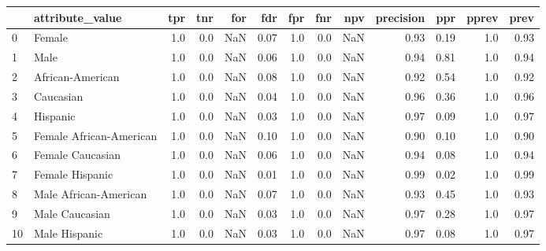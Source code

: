 \begin{tabular}{llrrrrrrrrrrr}
\toprule
{} &          attribute\_value &  tpr &  tnr &  for &   fdr &  fpr &  fnr &  npv &  precision &   ppr &  pprev &  prev \\
\midrule
0  &                   Female &  1.0 &  0.0 &  NaN &  0.07 &  1.0 &  0.0 &  NaN &       0.93 &  0.19 &    1.0 &  0.93 \\
1  &                     Male &  1.0 &  0.0 &  NaN &  0.06 &  1.0 &  0.0 &  NaN &       0.94 &  0.81 &    1.0 &  0.94 \\
2  &         African-American &  1.0 &  0.0 &  NaN &  0.08 &  1.0 &  0.0 &  NaN &       0.92 &  0.54 &    1.0 &  0.92 \\
3  &                Caucasian &  1.0 &  0.0 &  NaN &  0.04 &  1.0 &  0.0 &  NaN &       0.96 &  0.36 &    1.0 &  0.96 \\
4  &                 Hispanic &  1.0 &  0.0 &  NaN &  0.03 &  1.0 &  0.0 &  NaN &       0.97 &  0.09 &    1.0 &  0.97 \\
5  &  Female African-American &  1.0 &  0.0 &  NaN &  0.10 &  1.0 &  0.0 &  NaN &       0.90 &  0.10 &    1.0 &  0.90 \\
6  &         Female Caucasian &  1.0 &  0.0 &  NaN &  0.06 &  1.0 &  0.0 &  NaN &       0.94 &  0.08 &    1.0 &  0.94 \\
7  &          Female Hispanic &  1.0 &  0.0 &  NaN &  0.01 &  1.0 &  0.0 &  NaN &       0.99 &  0.02 &    1.0 &  0.99 \\
8  &    Male African-American &  1.0 &  0.0 &  NaN &  0.07 &  1.0 &  0.0 &  NaN &       0.93 &  0.45 &    1.0 &  0.93 \\
9  &           Male Caucasian &  1.0 &  0.0 &  NaN &  0.03 &  1.0 &  0.0 &  NaN &       0.97 &  0.28 &    1.0 &  0.97 \\
10 &            Male Hispanic &  1.0 &  0.0 &  NaN &  0.03 &  1.0 &  0.0 &  NaN &       0.97 &  0.08 &    1.0 &  0.97 \\
\bottomrule
\end{tabular}
